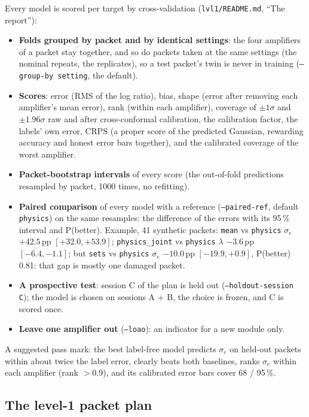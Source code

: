 \documentclass[10pt]{article}
\newcommand{\code}[1]{\texttt{#1}}
\begin{document}
Every model is scored per target by cross-validation (\code{lvl1/README.md}, ``The report''):
\begin{itemize}
\item \textbf{Folds grouped by packet and by identical settings}: the four amplifiers of a packet stay together, and so do packets taken at
  the same settings (the nominal repeats, the replicates), so a test packet's twin is never in training (\code{--group-by setting}, the
  default).
\item \textbf{Scores}: error (RMS of the log ratio), bias, shape (error after removing each amplifier's mean error), rank (within each
  amplifier), coverage of $\pm1\sigma$ and $\pm1.96\sigma$ raw and after cross-conformal calibration, the calibration factor, the labels'
  own error, CRPS (a proper score of the predicted Gaussian, rewarding accuracy and honest error bars together), and the calibrated
  coverage of the worst amplifier.
\item \textbf{Packet-bootstrap intervals} of every score (the out-of-fold predictions resampled by packet, 1000 times, no refitting).
\item \textbf{Paired comparison} of every model with a reference (\code{--paired-ref}, default \code{physics}) on the same resamples: the
  difference of the errors with its 95\,\% interval and P(better). Example, 41 synthetic packets: \code{mean} vs \code{physics}
  $\sigma_e$ $+42.5$\,pp $[+32.0, +53.9]$; \code{physics\_joint} vs \code{physics} $\lambda$ $-3.6$\,pp $[-6.4, -1.1]$; but \code{sets} vs
  \code{physics} $\sigma_e$ $-10.0$\,pp $[-19.9, +0.9]$, P(better) 0.81: that gap is mostly one damaged packet.
\item \textbf{A prospective test}: session C of the plan is held out (\code{--holdout-session C}); the model is chosen on sessions A + B,
  the choice is frozen, and C is scored once.
\item \textbf{Leave one amplifier out} (\code{--loao}): an indicator for a new module only.
\end{itemize}
A suggested pass mark: the best label-free model predicts $\sigma_e$ on held-out packets within about twice the label error, clearly
beats both baselines, ranks $\sigma_e$ within each amplifier (rank $> 0.9$), and its calibrated error bars cover 68 / 95\,\%.

\subsection{The level-1 packet plan}
\label{sec:lvl1plan}
\end{document}
